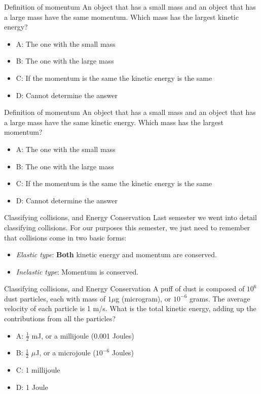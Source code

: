 \documentclass{beamer}
\begin{document}
\begin{frame}{Definition of momentum}
An object that has a small mass and an object that has a large mass have the same momentum. Which mass has the largest kinetic energy?
\begin{itemize}
\item A: The one with the small mass
\item B: The one with the large mass
\item C: If the momentum is the same the kinetic energy is the same
\item D: Cannot determine the answer
\end{itemize}
\end{frame}

\begin{frame}{Definition of momentum}
An object that has a small mass and an object that has a large mass have the same kinetic energy. Which mass has the largest momentum?
\begin{itemize}
\item A: The one with the small mass
\item B: The one with the large mass
\item C: If the momentum is the same the kinetic energy is the same
\item D: Cannot determine the answer
\end{itemize}
\end{frame}

\begin{frame}{Classifying collisions, and Energy Conservation}
Last semester we went into detail \alert{classifying collisions}.  For our purposes this semester, we just need to remember that collisions come in two basic forms:
\begin{itemize}
\item \textit{Elastic type}: \textbf{Both} kinetic energy and momentum are conserved.
\item \textit{Inelastic type}: Momentum is conserved.
\end{itemize}
\end{frame}

\begin{frame}{Classifying collisions, and Energy Conservation}
A puff of dust is composed of $10^6$ dust particles, each with mass of $1 \mu$g (microgram), or $10^{-6}$ grams.  The average velocity of each particle is 1 m/s.  What is the total kinetic energy, adding up the contributions from all the particles?
\begin{itemize}
\item A: $\frac{1}{2}$ mJ, or a millijoule (0.001 Joules)
\item B: $\frac{1}{2}$ $\mu$J, or a microjoule ($10^{-6}$ Joules)
\item C: 1 millijoule
\item D: 1 Joule
\end{itemize}
\end{frame}
\end{document}
